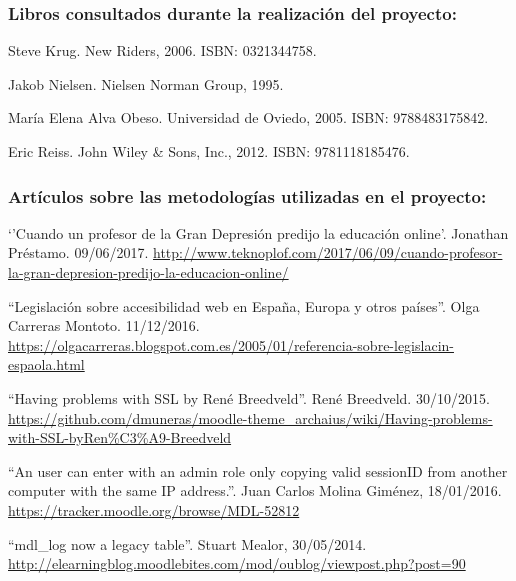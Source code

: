 



\subsubsection*{Libros consultados durante la realización del proyecto:}


Steve Krug.
\newblock New Riders, 2006.
\newblock ISBN: 0321344758.

Jakob Nielsen.
\newblock Nielsen Norman Group, 1995.

María Elena Alva Obeso.
\newblock Universidad de Oviedo, 2005.
\newblock ISBN: 9788483175842.

Eric Reiss.
\newblock John Wiley \& Sons, Inc., 2012.
\newblock ISBN: 9781118185476.


\subsubsection*{Artículos sobre las metodologías utilizadas en el proyecto:}

 `'Cuando un profesor de la Gran Depresión predijo la educación online'. Jonathan Préstamo. 09/06/2017. \url{http://www.teknoplof.com/2017/06/09/cuando-profesor-la-gran-depresion-predijo-la-educacion-online/}

 ``Legislación sobre accesibilidad web en España, Europa y otros países''. Olga Carreras Montoto. 11/12/2016. \url{https://olgacarreras.blogspot.com.es/2005/01/referencia-sobre-legislacin-espaola.html}

 ``Having problems with SSL by René Breedveld''. René Breedveld. 30/10/2015. \url{https://github.com/dmuneras/moodle-theme_archaius/wiki/Having-problems-with-SSL-byRen\%C3\%A9-Breedveld}

 ``An user can enter with an admin role only copying valid sessionID from another computer with the same IP address.''. Juan Carlos Molina Giménez, 18/01/2016. \url{https://tracker.moodle.org/browse/MDL-52812}

 ``mdl\_log now a legacy table''. Stuart Mealor, 30/05/2014. \url{http://elearningblog.moodlebites.com/mod/oublog/viewpost.php?post=90}

